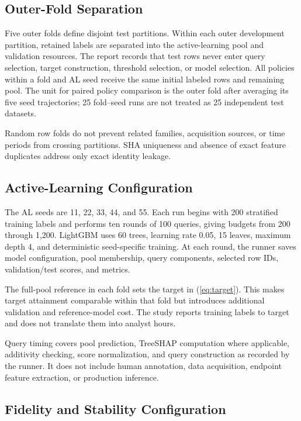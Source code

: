\subsection{Outer-Fold Separation}

Five outer folds define disjoint test partitions. Within each outer development
partition, retained labels are separated into the active-learning pool and
validation resources. The report records that test rows never enter query
selection, target construction, threshold selection, or model selection. All
policies within a fold and AL seed receive the same initial labeled rows and
remaining pool. The unit for paired policy comparison is the outer fold after
averaging its five seed trajectories; 25 fold--seed runs are not treated as 25
independent test datasets.

Random row folds do not prevent related families, acquisition sources, or time
periods from crossing partitions. SHA uniqueness and absence of exact feature
duplicates address only exact identity leakage.

\subsection{Active-Learning Configuration}

The AL seeds are 11, 22, 33, 44, and 55. Each run begins with 200 stratified
training labels and performs ten rounds of 100 queries, giving budgets from 200
through 1,200. LightGBM uses 60 trees, learning rate 0.05, 15 leaves, maximum
depth 4, and deterministic seed-specific training. At each round, the runner
saves model configuration, pool membership, query components, selected row IDs,
validation/test scores, and metrics.

The full-pool reference in each fold sets the target in
(\ref{eq:target}). This makes target attainment comparable within that fold but
introduces additional validation and reference-model cost. The study reports
training labels to target and does not translate them into analyst hours.

Query timing covers pool prediction, TreeSHAP computation where applicable,
additivity checking, score normalization, and query construction as recorded by
the runner. It does not include human annotation, data acquisition, endpoint
feature extraction, or production inference.

\subsection{Fidelity and Stability Configuration}

